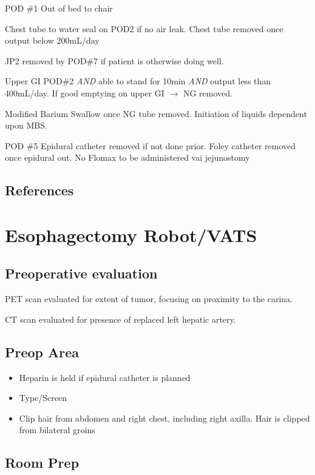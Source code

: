 \documentclass[
  letterpaper,
]{scrbook}
\providecommand{\tightlist}{%
  \setlength{\itemsep}{0pt}\setlength{\parskip}{0pt}}
\begin{document}
POD \#1 Out of bed to chair

Chest tube to water seal on POD2 if no air leak. Chest tube removed once
output below 200mL/day

JP2 removed by POD\#7 if patient is otherwise doing well.

Upper GI POD\#2 \emph{AND} able to stand for 10min \emph{AND} output
less than 400mL/day. If good emptying on upper GI \(\rightarrow\) NG
removed.

Modified Barium Swallow once NG tube removed. Initiation of liquids
dependent upon MBS.

POD \#5 Epidural catheter removed if not done prior. Foley catheter
removed once epidural out. No Flomax to be administered vai jejunostomy

\section{References}\label{references}

\chapter{Esophagectomy Robot/VATS}\label{esophagectomy-robotvats}

\section{Preoperative evaluation}\label{preoperative-evaluation-1}

PET scan evaluated for extent of tumor, focusing on proximity to the
carina.

CT scan evaluated for presence of replaced left hepatic artery.

\section{Preop Area}\label{preop-area-1}

\begin{itemize}
\tightlist
\item
  Heparin is held if epidural catheter is planned
\item
  Type/Screen
\item
  Clip hair from abdomen and right chest, including right axilla. Hair
  is clipped from bilateral groins
\end{itemize}

\section{Room Prep}\label{room-prep-2}
\end{document}
